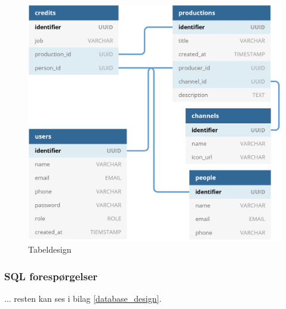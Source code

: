 \begin{figure}[ht]
    \centering
    \includegraphics[scale=0.2]{figures/database_design.PNG}  
    \caption{Tabeldesign}
    \label{fig:tabledesign}
\end{figure}{}


\subsubsection{SQL forespørgelser}
... resten kan ses i bilag \ref{database_design}.